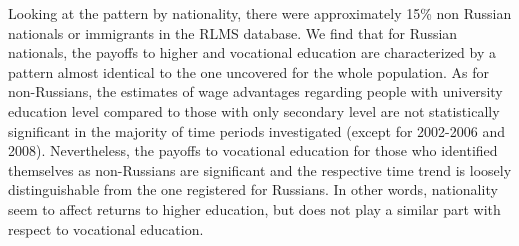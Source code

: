 \documentclass[12pt,a4paper]{article}
\begin{document}
Looking at the pattern by nationality, there were approximately 15\% non Russian nationals or immigrants in the RLMS database. We find that for Russian nationals, the payoffs to higher and vocational education are characterized by a pattern almost identical to the one uncovered for the whole population. As for non-Russians, the estimates of wage advantages regarding people with university education level compared to those with only secondary level are not statistically significant in the majority of time periods investigated (except for 2002-2006 and 2008). Nevertheless, the payoffs to vocational education for those who identified themselves as non-Russians are significant and the respective time trend is loosely distinguishable from the one registered for Russians. In other words, nationality seem to affect returns to higher education, but does not play a similar part with respect to vocational education.
\end{document}
